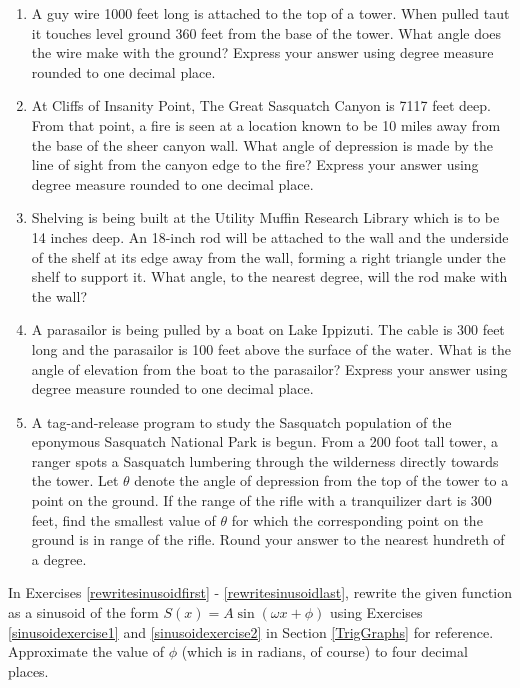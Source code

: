 \begin{enumerate}

\setcounter{enumi}{\value{HW}}

\item A guy wire 1000 feet long is attached to the top of a tower.  When pulled taut it touches level ground 360 feet from the base of the tower.  What angle does the wire make with the ground?  Express your answer using degree measure rounded to one decimal place.

\item At Cliffs of Insanity Point, The Great Sasquatch Canyon is 7117 feet deep.  From that point, a fire is seen at a location known to be 10 miles away from the base of the sheer canyon wall.  What angle of depression is made by the line of sight from the canyon edge to the fire?  Express your answer using degree measure rounded to one decimal place.

\item Shelving is being built at the Utility Muffin Research Library which is to be 14 inches deep.  An 18-inch rod will be attached to the wall and the underside of the shelf at its edge away from the wall, forming a right triangle under the shelf to support it.  What angle, to the nearest degree, will the rod make with the wall?

\item A parasailor is being pulled by a boat on Lake Ippizuti.  The cable is 300 feet long and the parasailor is 100 feet above the surface of the water.  What is the angle of elevation from the boat to the parasailor?  Express your answer using degree measure rounded to one decimal place.

\item  A tag-and-release program to study the Sasquatch population of the eponymous Sasquatch National Park is begun.  From a 200 foot tall tower, a ranger spots a Sasquatch lumbering through the wilderness directly towards the tower.  Let $\theta$ denote the angle of depression from the top of the tower to a point on the ground.  If the range of the rifle with a tranquilizer dart is 300 feet, find the smallest value of $\theta$ for which the corresponding point on the ground is in range of the rifle.  Round your answer to the nearest hundreth of a degree.

\setcounter{HW}{\value{enumi}}

\end{enumerate}

In Exercises \ref{rewritesinusoidfirst} - \ref{rewritesinusoidlast}, rewrite the given function as a sinusoid of the form $S(x) = A\sin(\omega x + \phi)$ using Exercises \ref{sinusoidexercise1} and \ref{sinusoidexercise2} in Section \ref{TrigGraphs} for reference.  Approximate the value of $\phi$ (which is in radians, of course) to four decimal places.

